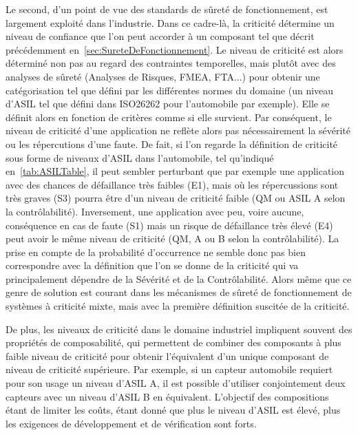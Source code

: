\documentclass[french, a4paper, 11pt, twoside, pdftex]{StyleThese}
\begin{document}
    Le second, d'un point de vue des standards de sûreté de fonctionnement, est largement exploité dans l'industrie. Dans ce cadre-là, la criticité détermine un niveau de confiance que l'on peut accorder à un composant tel que décrit précédemment en~\autoref{sec:SureteDeFonctionnement}. Le niveau de criticité est alors déterminé non pas au regard des contraintes temporelles, mais plutôt avec des analyses de sûreté (Analyses de Risques, FMEA, FTA...) pour obtenir une catégorisation tel que défini par les différentes normes du domaine (un niveau d'ASIL tel que défini dans ISO26262 pour l'automobile par exemple). Elle se définit alors en fonction de critères comme si elle survient. Par conséquent, le niveau de criticité d'une application ne reflète alors pas nécessairement la sévérité ou les répercutions d'une faute. De fait, si l'on regarde la définition de criticité sous forme de niveaux d'ASIL dans l'automobile, tel qu'indiqué en~\autoref{tab:ASILTable}, il peut sembler perturbant que par exemple une application avec des chances de défaillance très faibles (E1), mais où les répercussions sont très graves (S3) pourra être d'un niveau de criticité faible (QM ou ASIL A selon la contrôlabilité). Inversement, une application avec peu, voire aucune, conséquence en cas de faute (S1) mais un risque de défaillance très élevé (E4) peut avoir le même niveau de criticité (QM, A ou B selon la contrôlabilité). La prise en compte de la probabilité d'occurrence ne semble donc pas bien correspondre avec la définition que l'on se donne de la criticité qui va principalement dépendre de la Sévérité et de la Contrôlabilité. %
    Alors même que ce genre de solution est courant dans les mécanismes de sûreté de fonctionnement de systèmes à criticité mixte, mais avec la première définition suscitée de la criticité. 
    
    De plus, les niveaux de criticité dans le domaine industriel impliquent souvent des propriétés de composabilité, qui permettent de combiner des composants à plus faible niveau de criticité pour obtenir l'équivalent d'un unique composant de niveau de criticité supérieure. Par exemple, si un capteur automobile requiert pour son usage un niveau d'ASIL A, il est possible d'utiliser conjointement deux capteurs avec un niveau d'ASIL B en équivalent. L'objectif des compositions étant de limiter les coûts, étant donné que plus le niveau d'ASIL est élevé, plus les exigences de développement et de vérification sont forts.
    
\end{document}
